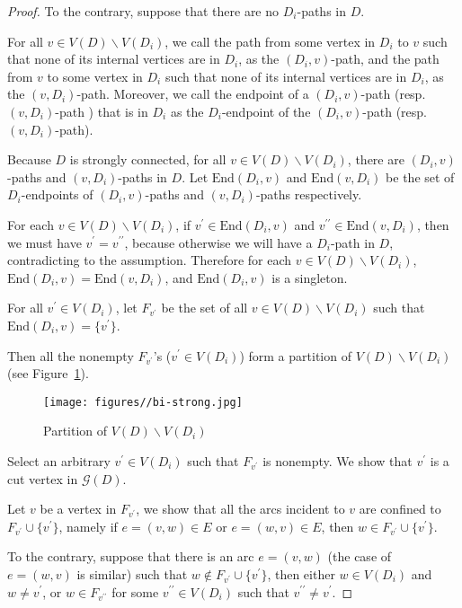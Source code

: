 \documentclass{article}
\begin{document}
\begin{proof}
To the contrary, suppose that there are no $D_i$-paths in $D$.

For all $v \in V(D) \backslash V(D_i)$, we call the path from some
vertex in $D_i$ to $v$ such that none of its internal vertices are
in $D_i$, as the $(D_i,v)$-path, and the path from $v$ to some
vertex in $D_i$ such that none of its internal vertices are in
$D_i$, as the $(v, D_i)$-path. Moreover, we call the endpoint of a
$(D_i,v)$-path (resp.$(v,D_i)$-path ) that is in $D_i$ as the
$D_i$-endpoint of the $(D_i,v)$-path (resp. $(v,D_i)$-path).

Because $D$ is strongly connected, for all $v \in V(D) \backslash
V(D_i)$, there are $(D_i,v)$-paths and $(v,D_i)$-paths in $D$. Let
$\textrm{End}(D_i,v)$ and $\textrm{End}(v,D_i)$ be the set of
$D_i$-endpoints of $(D_i,v)$-paths and $(v,D_i)$-paths respectively.

For each $v \in V(D) \backslash V(D_i)$, if $v^{\prime} \in
\textrm{End}(D_i,v)$ and $v^{\prime\prime} \in \textrm{End}(v,D_i)$,
then we must have $v^\prime = v^{\prime\prime}$, because otherwise
we will have a $D_i$-path in $D$, contradicting to the assumption.
Therefore for each $v \in V(D) \backslash V(D_i)$,
$\textrm{End}(D_i,v)=\textrm{End}(v,D_i)$, and $\textrm{End}(D_i,v)$
is a singleton.

For all $v^\prime \in V(D_i)$, let $F_{v^{\prime}}$ be the set of
all $v \in V(D) \backslash V(D_i)$ such that
$\textrm{End}(D_i,v)=\{v^\prime\}$.

Then all the nonempty $F_{v^{\prime}}$'s ($v^{\prime} \in V(D_i)$)
form a partition of $V(D) \backslash V(D_i)$ (see
Figure~\ref{fig:bi-strong}).

\begin{figure}[ht]
\centering
  \texttt{[image: figures//bi-strong.jpg]}
  \caption{Partition of $V(D) \backslash V(D_i)$}\label{fig:bi-strong}
\end{figure}

Select an arbitrary $v^\prime \in V(D_i)$ such that $F_{v^{\prime}}$
is nonempty. We show that $v^\prime$ is a cut vertex in
$\mathcal{G}(D)$.

Let $v$ be a vertex in $F_{v^{\prime}}$, we show that all the arcs
incident to $v$ are confined to $F_{v^{\prime}} \cup \{v^\prime\}$,
namely if $e=(v,w) \in E$ or $e=(w,v) \in E$, then $w\in
F_{v^{\prime}}\cup \{v^\prime\}$.

To the contrary, suppose that there is an arc $e=(v,w)$ (the case of
$e=(w,v)$ is similar) such that $w \not \in F_{v^{\prime}} \cup
\{v^\prime\}$, then either $w \in V(D_i)$ and $w \neq v^\prime$, or
$w \in F_{v^{\prime\prime}}$ for some $v^{\prime\prime} \in V(D_i)$
such that $v^{\prime\prime} \neq v^\prime$.


\end{proof}
\end{document}
